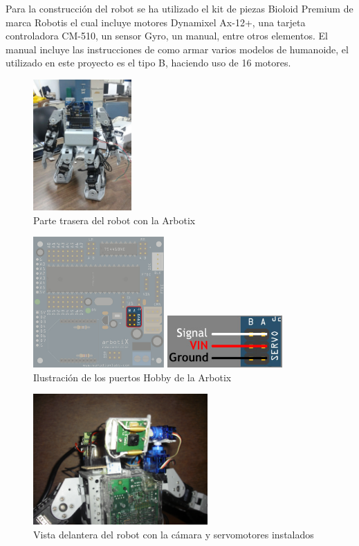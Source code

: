 \documentclass[conference, letterpaper]{IEEEtranMC1}
\begin{document}
Para la construcción del robot se ha utilizado el kit de piezas Bioloid Premium de marca Robotis el cual incluye motores Dynamixel Ax-12+, una tarjeta controladora CM-510, un sensor Gyro, un manual, entre otros elementos. El manual incluye las instrucciones de como armar varios modelos de humanoide, el utilizado en este proyecto es el tipo B, haciendo uso de 16 motores. 
\begin{figure}[ht!]
	\centering
		\includegraphics[height=05cm]{arbotixsola.jpg}
	\caption{  Parte trasera del robot con la Arbotix}
	\label{fig:figura1}
\end{figure}
\begin{figure}[ht!]
	\centering
		\includegraphics[height=05cm]{arbotix_hobby_servo.jpg}
		
    	\includegraphics[height=2cm]{arbotix_hobbyservos_lines.jpg}
	\caption{  Ilustración de los puertos Hobby de la Arbotix
}
	\label{fig:figura2}
\end{figure}

\begin{figure}[ht!]
	\centering
		\includegraphics[height=05cm]{CIMG0025.JPG} 	
	\caption{ Vista delantera del robot con la cámara y servomotores instalados}
	\label{fig:figura3}
\end{figure}
\end{document}
